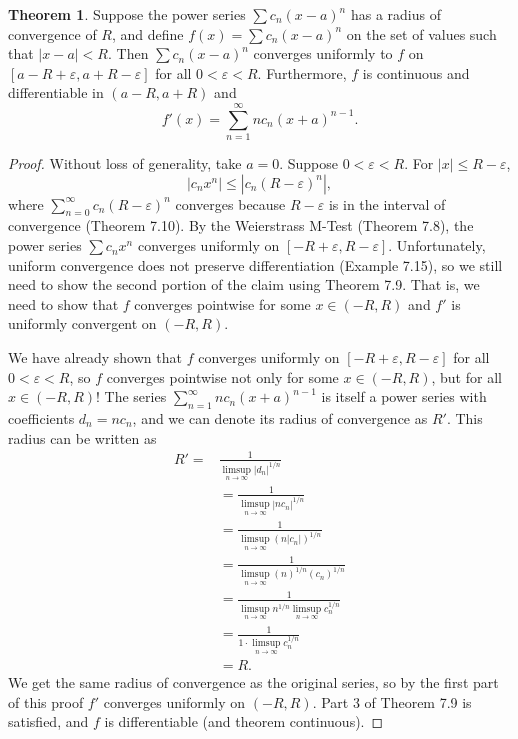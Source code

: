 \documentclass{article}
\theoremstyle{definition}
\newtheorem{theorem}{Theorem}[section]
\begin{document}
	
	\begin{theorem}
		Suppose the power series $ \sum c_n(x-a)^n $ has a radius of convergence of $ R $, and define $ f(x)=\sum c_n(x-a)^n $ on the set of values such that $ |x-a|<R $. Then $ \sum c_n(x-a)^n $ converges uniformly to $ f $ on $ [a-R +\varepsilon,a+R-\varepsilon] $ for all $ 0<\varepsilon < R $. Furthermore, $ f $ is continuous and differentiable in $ (a-R,a+R) $ and $$f'(x)=\sum_{n=1}^{\infty}nc_n(x+a)^{n-1} .$$ 
	\end{theorem}
	\begin{proof}
		Without loss of generality, take $ a = 0 $. Suppose $ 0<\varepsilon < R$. For $ |x|\le R-\varepsilon $, $$|c_nx^n|\le |c_n(R-\varepsilon)^n|,$$ where $ \sum_{n=0}^{\infty} c_n(R-\varepsilon)^n $ converges because $ R- \varepsilon $ is in the interval of convergence (Theorem 7.10). By the Weierstrass M-Test (Theorem 7.8), the power series $ \sum c_nx^n $ converges uniformly on $ [-R+\varepsilon, R-\varepsilon] $. Unfortunately, uniform convergence does not preserve differentiation (Example 7.15), so we still need to show the second portion of the claim using Theorem 7.9. That is, we need to show that $ f $ converges pointwise for some $ x\in(-R,R)  $  and $ f' $ is uniformly convergent on $ (-R,R) $. 
		
		We have already shown that $ f $ converges uniformly on $ [-R+\varepsilon, R-\varepsilon] $ for all $ 0<\varepsilon<R $, so $ f $ converges pointwise not only for some $ x\in(-R,R) $, but for all $ x\in(-R,R) $! The series $ \sum_{n=1}^{\infty}nc_n(x+a)^{n-1} $ is itself a power series with coefficients $ d_n = nc_n $, and we can denote its radius of convergence as $ R' $. This radius can be written as
		\begin{align*}
			R' = & \frac{1}{\limsup\limits_{n\to\infty}|d_n|^{1/n}}\\ &=\frac{1}{\limsup\limits_{n\to\infty}|nc_n|^{1/n}}\\&=\frac{1}{\limsup\limits_{n\to\infty}(n|c_n|)^{1/n}}\\&=\frac{1}{\limsup\limits_{n\to\infty}(n)^{1/n}(c_n)^{1/n}}\\&= \frac{1}{\limsup\limits_{n\to\infty}n^{1/n}\limsup\limits_{n\to\infty}c_n^{1/n}}\\&= \frac{1}{1\cdot \limsup\limits_{n\to\infty}c_n^{1/n}}\\ & = R.
		\end{align*}
		We get the same radius of convergence as the original series, so by the first part of this proof $ f' $ converges uniformly on $ (-R,R) $. Part 3 of Theorem 7.9 is satisfied, and $ f $ is differentiable (and theorem continuous). 
	\end{proof}
	
\end{document}
